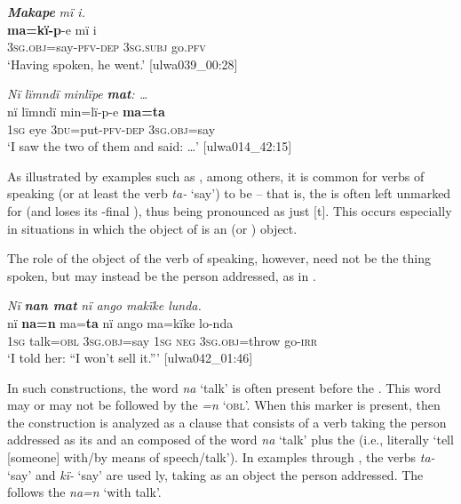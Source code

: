 \ea%
    \label{ex:syntax:190}
          \textbf{\textit{Makape}} \textit{mï i.}\\
\gll    \textbf{ma=kï-p}{}-e        mï      i\\
    3\textsc{sg.obj}=say-\textsc{pfv-dep}  3\textsc{sg.subj}  go.\textsc{pfv}\\
\glt `Having spoken, he went.’ [ulwa039\_00:28]
\z

\ea%
    \label{ex:syntax:191}
          \textit{Nï lïmndï minlïpe} \textbf{\textit{mat}}\textit{: …}\\
\gll    nï    lïmndï  min=lï-p-e      \textbf{ma=ta}\\
    1\textsc{sg}  eye    3\textsc{du}=put-\textsc{pfv-dep}  \textsc{3sg.obj}=say\\
\glt `I saw the two of them and said: …’ [ulwa014\_42:15]
\z

As illustrated by examples such as , among others, it is common for verbs of speaking (or at least the verb \textit{ta-} ‘say’) to be  -- that is, the  is often left unmarked for  (and loses its -final ), thus being pronounced as just [t]. This occurs especially in situations in which the object of  is an  (or ) object.

  The role of the object of the  verb of speaking, however, need not be the thing spoken, but may instead be the person addressed, as in .

  \ea%
    \label{ex:syntax:192}
          \textit{Nï} \textbf{\textit{nan mat}} \textit{nï ango makïke lunda.}\\
\gll    nï    \textbf{na=n}    ma=\textbf{ta}      nï    ango  ma=kïke     lo-nda\\
    1\textsc{sg}  talk=\textsc{obl}  3\textsc{sg.obj}=say  \textsc{1sg}  \textsc{neg}  \textsc{3sg.obj=}throw     go-\textsc{irr}\\
\glt `I told her: “I won’t sell it.”’ [ulwa042\_01:46]
\z
   
  In such constructions, the word \textit{na} ‘talk’ is often present before the . This word may or may not be followed by the  \textit{=n} ‘\textsc{obl}’. When this marker is present, then the construction is analyzed as a clause that consists of a  verb taking the person addressed as its  and an   composed of the word \textit{na} ‘talk’ plus the  (i.e., literally ‘tell [someone] with/by means of speech/talk’). In examples  through , the verbs \textit{ta-} ‘say’ and \textit{kï-} ‘say’ are used ly, taking as an object the person addressed. The  follows the   \textit{na=n} ‘with talk’.

